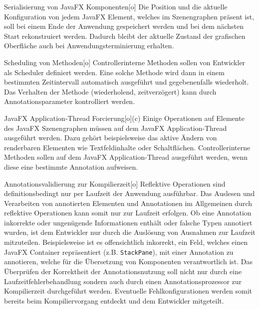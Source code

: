\begin{freq}{Serialisierung von JavaFX Komponenten}[o]
	Die Position und die aktuelle Konfiguration von jedem JavaFX Element, welches im Szenengraphen präsent ist, soll bei einem Ende der Anwendung gespeichert werden und bei dem nächsten Start rekonstruiert werden. Dadurch bleibt der aktuelle Zustand der grafischen Oberfläche auch bei Anwendungsterminierung erhalten.
\end{freq}
\begin{freq}{Scheduling von Methoden}[o]
	Controllerinterne Methoden sollen von Entwickler als Scheduler definiert werden. Eine solche Methode wird dann in einem bestimmten Zeitintervall automatisch ausgeführt und gegebenenfalls wiederholt. Das Verhalten der Methode (wiederholend, zeitverzögert) kann durch Annotationsparameter kontrolliert werden.
\end{freq}
\begin{freq}{JavaFX Application-Thread Forcierung}[o](c)
	Einige Operationen auf Elemente des JavaFX Szenengraphen müssen auf dem JavaFX Application-Thread ausgeführt werden. Dazu gehört beispielsweise das aktive Ändern von renderbaren Elementen wie Textfeldinhalte oder Schaltflächen. Controllerinterne Methoden sollen auf dem JavaFX Application-Thread ausgeführt werden, wenn diese eine bestimmte Annotation aufweisen.
\end{freq}
\begin{freq}{Annotationsvalidierung zur Kompilierzeit}[o]
	Reflektive Operationen sind definitionsbedingt nur per Laufzeit der Anwendung ausführbar. Das Auslesen und Verarbeiten von annotierten Elementen und Annotationen im Allgemeinen durch reflektive Operationen kann somit nur zur Laufzeit erfolgen. Ob eine Annotation inkorrekte oder ungenügende Informationen enthält oder falsche Typen annotiert wurden, ist dem Entwickler nur durch die Auslösung von Ausnahmen zur Laufzeit mitzuteilen. Beispielsweise ist es offensichtlich inkorrekt, ein Feld, welches einen JavaFX Container repräsentiert (z.B. \texttt{StackPane}), mit einer Annotation zu annotieren, welche für die Übersetzung von Komponenten verantwortlich ist. Das Überprüfen der Korrektheit der Annotationsnutzung soll nicht nur durch eine Laufzeitfehlerbehandlung sondern auch durch einen Annotationsprozessor zur Kompilierzeit durchgeführt werden. Eventuelle Fehlkonfigurationen werden somit bereits beim Kompiliervorgang entdeckt und dem Entwickler mitgeteilt.
\end{freq}
